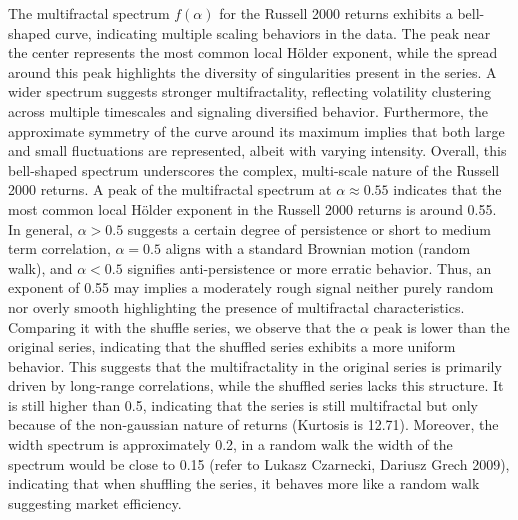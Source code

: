 \documentclass[11pt]{extarticle}
\begin{document}
The multifractal spectrum $f(\alpha)$ for the Russell 2000 returns exhibits a bell-shaped curve,
indicating multiple scaling behaviors in the data. The peak near the center represents the most common local Hölder
exponent, while the spread around this peak highlights the diversity of singularities present in the series. A wider
spectrum suggests stronger multifractality, reflecting volatility clustering across multiple timescales and signaling diversified
behavior. Furthermore,
the approximate symmetry of the curve around its maximum implies that both large and small fluctuations are represented,
albeit with varying intensity. Overall, this bell-shaped spectrum underscores the complex, multi-scale nature of the
Russell 2000 returns.
A peak of the multifractal spectrum at $\alpha \approx 0.55$ indicates that the most common local Hölder exponent
in the Russell 2000 returns is around 0.55. In general, $\alpha > 0.5$ suggests a certain degree of persistence or
short to medium term correlation, $\alpha = 0.5$ aligns with a standard Brownian motion (random walk),
and $\alpha < 0.5$ signifies anti-persistence or more erratic behavior. Thus, an exponent of 0.55 may implies a
moderately rough signal neither purely random nor overly smooth highlighting the presence of multifractal characteristics.
Comparing it with the shuffle series, we observe that the $\alpha$ peak is lower than the original series, indicating that the
shuffled series exhibits a more uniform behavior. This suggests that the multifractality in the original series is primarily
driven by long-range correlations, while the shuffled series lacks this structure. It is still higher than 0.5, indicating
that the series is still multifractal but only because of the non-gaussian nature of returns (Kurtosis is 12.71). Moreover, the width spectrum
is approximately 0.2, in a random walk the width of the spectrum would be close to 0.15 (refer to Lukasz Czarnecki, Dariusz Grech 2009),
indicating that when shuffling the series, it behaves more like a random walk suggesting market efficiency.
\end{document}
